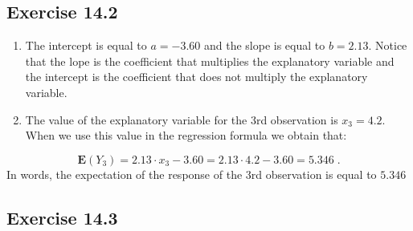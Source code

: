 \documentclass[
]{krantz}
\newcommand{\Expec}{\mathbf{E}}
\theoremstyle{definition}
\theoremstyle{definition}
\theoremstyle{definition}
\theoremstyle{remark}
\begin{document}
\hypertarget{exercise-14.2}{%
\subsection*{Exercise 14.2}\label{exercise-14.2}}


\begin{enumerate}
\def\labelenumi{\arabic{enumi}.}
\item
  The intercept is equal to
  \(a = -3.60\) and the slope is equal to \(b = 2.13\). Notice that the lope
  is the coefficient that multiplies the explanatory variable and the
  intercept is the coefficient that does not multiply the explanatory
  variable.
\item
  The value of the explanatory
  variable for the 3rd observation is \(x_3 = 4.2\). When we use this value
  in the regression formula we obtain that:
\end{enumerate}

\[\Expec(Y_3) = 2.13 \cdot x_3 - 3.60 = 2.13 \cdot 4.2 - 3.60 = 5.346\;.\]
In words, the expectation of the response of the 3rd observation is
equal to \(5.346\)

\hypertarget{exercise-14.3}{%
\subsection*{Exercise 14.3}\label{exercise-14.3}}
\end{document}
